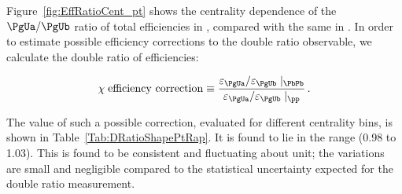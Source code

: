 Figure~\ref{fig:EffRatioCent_pt} shows the centrality dependence of the ${\PgUa}/{\PgUb}$ ratio of total efficiencies  in \PbPb, compared with the same in \pp.
%
In order to estimate possible efficiency corrections to the double ratio %
observable,  we calculate the double ratio of efficiencies: 

\[
\chi \; 
\text{efficiency correction} \equiv \frac{ \varepsilon_{\PgUa} / \varepsilon_{\PgUb} \mid_\PbPb} { \varepsilon_{\PgUa} / \varepsilon_{\PgUb} \mid_\pp} \,.
\]

The value of such a possible correction, evaluated for different centrality bins, is shown in 
Table~\ref{Tab:DRatioShapePtRap}. %
It is found to lie in the range (0.98 to 1.03). This is found to be consistent and fluctuating about unit; the variations are small and negligible compared to the statistical uncertainty expected for the double ratio measurement. 

%

